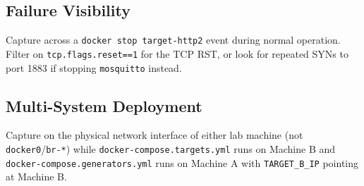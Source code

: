 \subsection{Failure Visibility}

Capture across a \texttt{docker stop target-http2} event during normal
operation. Filter on \texttt{tcp.flags.reset==1} for the TCP RST, or look for
repeated SYNs to port 1883 if stopping \texttt{mosquitto} instead.


\subsection{Multi-System Deployment}

Capture on the physical network interface of either lab machine (not
\texttt{docker0}/\texttt{br-*}) while \texttt{docker-compose.targets.yml} runs
on Machine B and \texttt{docker-compose.generators.yml} runs on Machine A with
\texttt{TARGET\_B\_IP} pointing at Machine B.

